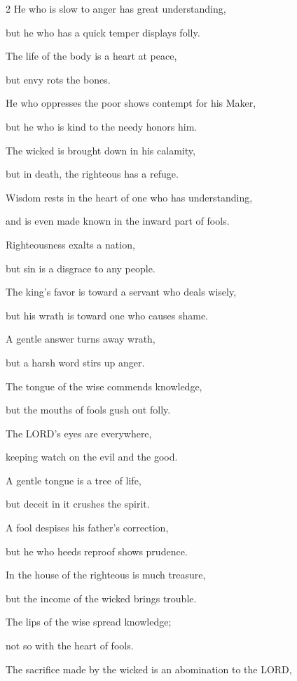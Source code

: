 \begin{multicols}{2}
\myverse{}He who is slow to anger has great understanding,

but he who has a quick temper displays folly.


\myverse{}The life of the body is a heart at peace,

but envy rots the bones.


\myverse{}He who oppresses the poor shows contempt for his Maker,

but he who is kind to the needy honors him.


\myverse{}The wicked is brought down in his calamity,

but in death, the righteous has a refuge.


\myverse{}Wisdom rests in the heart of one who has understanding,

and is even made known in the inward part of fools.


\myverse{}Righteousness exalts a nation,

but sin is a disgrace to any people.


\myverse{}The king’s favor is toward a servant who deals wisely,

but his wrath is toward one who causes shame.


\mychapter{} \myverse*{}A gentle answer turns away wrath,

\quad\quad but a harsh word stirs up anger.


\myverse{}The tongue of the wise commends knowledge,

but the mouths of fools gush out folly.


\myverse{}The LORD’s eyes are everywhere,

keeping watch on the evil and the good.


\myverse{}A gentle tongue is a tree of life,

but deceit in it crushes the spirit.


\myverse{}A fool despises his father’s correction,

but he who heeds reproof shows prudence.


\myverse{}In the house of the righteous is much treasure,

but the income of the wicked brings trouble.


\myverse{}The lips of the wise spread knowledge;

not so with the heart of fools.


\myverse{}The sacrifice made by the wicked is an abomination to the LORD,


\end{multicols}
